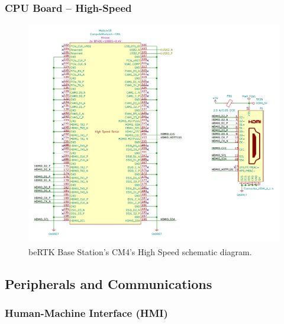 
\subsubsection{CPU Board -- High-Speed}\label{sec:3222_CM4_HSpeed}

\begin{figure}[h]
	\centering
	\includegraphics[width=1.0\textwidth]{Chapters/Figures/chapter3/CM4_HighSpeed.pdf}
	\caption{beRTK\textsuperscript{\textregistered} Base Station's CM4's High Speed schematic diagram.}
	\label{fig:CM4_HighSpeed_circuit}
\end{figure}



\subsection{Peripherals and Communications}\label{sec:323_PERIPHERALS_COMMS}


\subsubsection{Human-Machine Interface (HMI)}\label{sec:3231_BACKPANEL}

